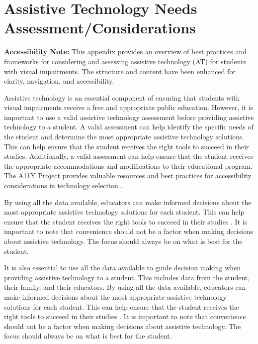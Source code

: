 \chapter{Assistive Technology Needs Assessment/Considerations}\label{app3:trouble3}

\noindent
\textbf{Accessibility Note:} This appendix provides an overview of best practices and frameworks for considering and assessing assistive technology (AT) for students with visual impairments. The structure and content have been enhanced for clarity, navigation, and accessibility.

Assistive technology is an essential component of ensuring that students with visual impairments receive a free and appropriate public education. However, it is important to use a valid assistive technology assessment before providing assistive technology to a student. A valid assessment can help identify the specific needs of the student and determine the most appropriate assistive technology solutions. This can help ensure that the student receives the right tools to succeed in their studies. Additionally, a valid assessment can help ensure that the student receives the appropriate accommodations and modifications to their educational program. The A11Y Project provides valuable resources and best practices for accessibility considerations in technology selection \supercite{A11yProject}.

By using all the data available, educators can make informed decisions about the most appropriate assistive technology solutions for each student. This can help ensure that the student receives the right tools to succeed in their studies  \supercite{AEMCenter}. It is important to note that convenience should not be a factor when making decisions about assistive technology. The focus should always be on what is best for the student.

It is also essential to use all the data available to guide decision making when providing assistive technology to a student. This includes data from the student, their family, and their educators. By using all the data available, educators can make informed decisions about the most appropriate assistive technology solutions for each student. This can help ensure that the student receives the right tools to succeed in their studies \supercite{AEMCenter}. It is important to note that convenience should not be a factor when making decisions about assistive technology. The focus should always be on what is best for the student.

